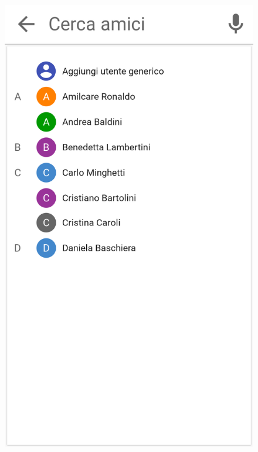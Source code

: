 \begin{figure}[H]
	\begin{minipage}{.49\textwidth}
		\includegraphics[width=\textwidth]{img/wireframe/aggiungi_utente.png}
	\end{minipage}
	\begin{minipage}{.49\textwidth}

\end{minipage}
\end{figure}
